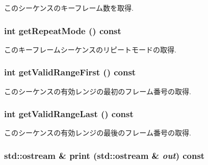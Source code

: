 このシーケンスのキーフレーム数を取得. \hypertarget{classm3g_1_1KeyframeSequence_a356af60b9759d5d3da833773e3c7b73}{
\subsubsection[{getRepeatMode}]{\setlength{\rightskip}{0pt plus 5cm}int getRepeatMode () const}}
\label{classm3g_1_1KeyframeSequence_a356af60b9759d5d3da833773e3c7b73}


このキーフレームシーケンスのリピートモードの取得. \hypertarget{classm3g_1_1KeyframeSequence_b7e54386674cefdb8f5fa65ce5435b50}{
\subsubsection[{getValidRangeFirst}]{\setlength{\rightskip}{0pt plus 5cm}int getValidRangeFirst () const}}
\label{classm3g_1_1KeyframeSequence_b7e54386674cefdb8f5fa65ce5435b50}


このシーケンスの有効レンジの最初のフレーム番号の取得. \hypertarget{classm3g_1_1KeyframeSequence_aa98cc8d698c482c33a3487c33db27d0}{
\subsubsection[{getValidRangeLast}]{\setlength{\rightskip}{0pt plus 5cm}int getValidRangeLast () const}}
\label{classm3g_1_1KeyframeSequence_aa98cc8d698c482c33a3487c33db27d0}


このシーケンスの有効レンジの最後のフレーム番号の取得. \hypertarget{classm3g_1_1KeyframeSequence_6fea17fa1532df3794f8cb39cb4f911f}{
\subsubsection[{print}]{\setlength{\rightskip}{0pt plus 5cm}std::ostream \& print (std::ostream \& {\em out}) const}}
\label{classm3g_1_1KeyframeSequence_6fea17fa1532df3794f8cb39cb4f911f}


